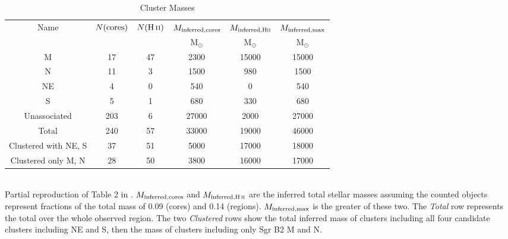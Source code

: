 \begin{table*}[htp]
\centering
\begin{minipage}{130mm}
\caption{Cluster Masses}
\begin{tabular}{cccccc}
\label{tab:clustermassestimates}
Name & $N({\rm cores})$ & $N(\hii)$ & $M_{\rm inferred, cores}$ & $M_{\rm inferred, H\textsc{ii}}$ & $M_{\rm inferred,max}$ \\
 &  &  & $\mathrm{M_{\odot}}$ & $\mathrm{M_{\odot}}$ & $\mathrm{M_{\odot}}$ \\
\hline
M & 17 & 47 & 2300 & 15000 & 15000 \\
N & 11 & 3 & 1500 & 980 & 1500 \\
NE & 4 & 0 & 540 & 0 & 540 \\
S & 5 & 1 & 680 & 330 & 680 \\
Unassociated & 203 & 6 & 27000 & 2000 & 27000 \\
Total & 240 & 57 & 33000 & 19000 & 46000 \\
Clustered with NE, S & 37 & 51 & 5000 & 17000 & 18000 \\
Clustered only M, N & 28 & 50 & 3800 & 16000 & 17000 \\
\hline
\end{tabular}\\
Partial reproduction of Table 2 in \citet{Ginsburg2018a}. $M_{\rm inferred,cores}$ and $M_{\rm inferred,\hii}$ are the inferred total stellar masses assuming the counted objects represent fractions of the total mass of 0.09 (cores) and 0.14 (\hii regions). $M_{\rm inferred,max}$ is the greater of these two. The \emph{Total} row represents the total over the whole observed region.  The two \emph{Clustered} rows show the total inferred mass of clusters including all four candidate clusters including NE and S, then the mass of clusters including only Sgr B2 M and N.
\end{minipage}
\end{table*}
